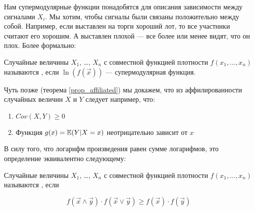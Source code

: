 Нам супермодулярные функции понадобятся для описания зависимости между сигналами  $X_{i}$. Мы хотим, чтобы сигналы были связаны положительно между собой. Например, если выставлен на торги хороший лот, то все участники считают его хорошим. А выставлен плохой — все более или менее видят, что он плох. Более формально:


\begin{mydef}
Случайные величины $ X_{1} $, \ldots, $ X_{n} $ с совместной функцией плотности $ f(x_{1},\ldots,x_{n}) $ называются , если $ \ln(f(\vec{x})) $ — супермодулярная функция.
\end{mydef}

Чуть позже (теорема \ref{prop_affiliated}) мы докажем, что из аффилированности случайных величин $ X $ и $ Y $ следует например, что:
\begin{enumerate}
\item $ Cov(X,Y)\geq 0 $
\item Функция $g(x)= \operatorname{\mathbb{E}}(Y|X=x) $ неотрицательно зависит от $ x $
\end{enumerate}

В силу того, что логарифм произведения равен сумме логарифмов, это определение эквивалентно следующему:
\begin{mydef}
Случайные величины $ X_{1} $, \ldots, $ X_{n} $ с совместной функцией плотности $ f(x_{1},\ldots,x_{n}) $ называются , если

\begin{equation}
f(\vec{x}\wedge\vec{y})\cdot f(\vec{x}\vee\vec{y})\geq f(\vec{x})\cdot f(\vec{y})
\end{equation}
\end{mydef}











